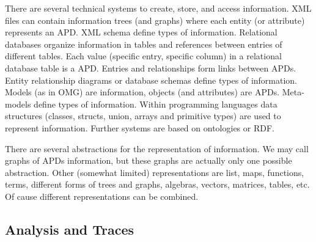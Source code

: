 There are several technical systems to create, store, and access information. XML files can contain information trees (and graphs) where each entity (or attribute) represents an APD. XML schema define types of information. Relational databases organize information in tables and references between entries of different tables. Each value (specific entry, specific column) in a relational database table is a APD. Entries and relationships form links between APDs. Entity relationship diagrams or database schemas define types of information. Models (as in OMG) are information, objects (and attributes) are APDs. Meta-models define types of information. Within programming languages data structures (classes, structs, union, arrays and primitive types) are used to represent information. Further systems are based on ontologies or RDF.

There are several abstractions for the representation of information. We may call graphs of APDs information, but these graphs are actually only one possible abstraction. Other (somewhat limited) representations are list, maps, functions, terms, different forms of trees and graphs, algebras, vectors, matrices, tables, etc. Of cause different representations can be combined. 

\subsection{Analysis and Traces}
 
